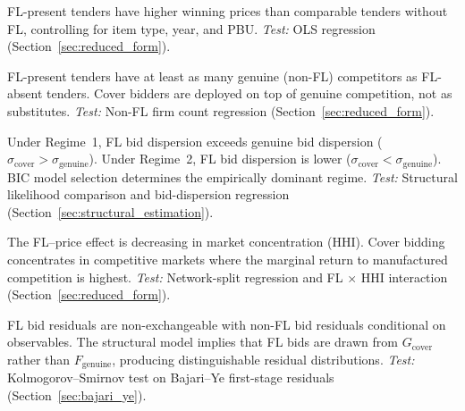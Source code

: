 \begin{prediction}
\label{pred:price_v6}
FL-present tenders have higher winning prices than comparable tenders
without FL, controlling for item type, year, and PBU.
\emph{Test:} OLS regression (Section~\ref{sec:reduced_form}).
\end{prediction}

\begin{prediction}
\label{pred:selection_v6}
FL-present tenders have at least as many genuine (non-FL) competitors as
FL-absent tenders. Cover bidders are deployed on top of genuine
competition, not as substitutes.
\emph{Test:} Non-FL firm count regression (Section~\ref{sec:reduced_form}).
\end{prediction}

\begin{prediction}
\label{pred:regime_v6}
Under Regime~1, FL bid dispersion exceeds genuine bid dispersion
($\sigma_{\text{cover}} > \sigma_{\text{genuine}}$). Under Regime~2,
FL bid dispersion is lower ($\sigma_{\text{cover}} <
\sigma_{\text{genuine}}$). BIC model selection determines the
empirically dominant regime.
\emph{Test:} Structural likelihood comparison and bid-dispersion
regression (Section~\ref{sec:structural_estimation}).
\end{prediction}

\begin{prediction}
\label{pred:market_v6}
The FL--price effect is decreasing in market concentration (HHI).
Cover bidding concentrates in competitive markets where the marginal
return to manufactured competition is highest.
\emph{Test:} Network-split regression and FL $\times$ HHI interaction
(Section~\ref{sec:reduced_form}).
\end{prediction}

\begin{prediction}
\label{pred:exchange_v6}
FL bid residuals are non-exchangeable with non-FL bid residuals
conditional on observables. The structural model implies that FL bids
are drawn from $G_{\text{cover}}$ rather than $F_{\text{genuine}}$,
producing distinguishable residual distributions.
\emph{Test:} Kolmogorov--Smirnov test on Bajari--Ye first-stage
residuals (Section~\ref{sec:bajari_ye}).
\end{prediction}

